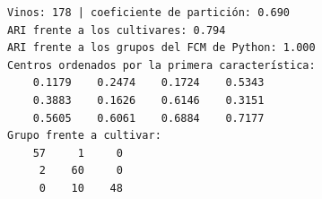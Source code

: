 \documentclass[11pt,letterpaper]{article}
\begin{document}
\begin{lstlisting}[language={}, numbers=none, caption={Salida de puente\_matlab\_wine.m}]
Vinos: 178 | coeficiente de partición: 0.690
ARI frente a los cultivares: 0.794
ARI frente a los grupos del FCM de Python: 1.000
Centros ordenados por la primera característica:
    0.1179    0.2474    0.1724    0.5343
    0.3883    0.1626    0.6146    0.3151
    0.5605    0.6061    0.6884    0.7177
Grupo frente a cultivar:
    57     1     0
     2    60     0
     0    10    48
\end{lstlisting}
\end{document}
